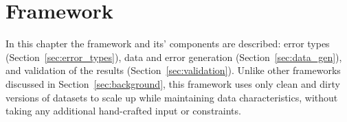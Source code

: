 \chapter{Framework}
\label{sec:benchmark}
In this chapter the framework and its' components are described: error types (Section~\ref{sec:error_types}), data and error generation (Section~\ref{sec:data_gen}), and validation of the results (Section~\ref{sec:validation}).
Unlike other frameworks discussed in Section~\ref{sec:background}, this framework uses only clean and dirty versions of datasets to scale up while maintaining data characteristics, without taking any additional hand-crafted input or constraints.




